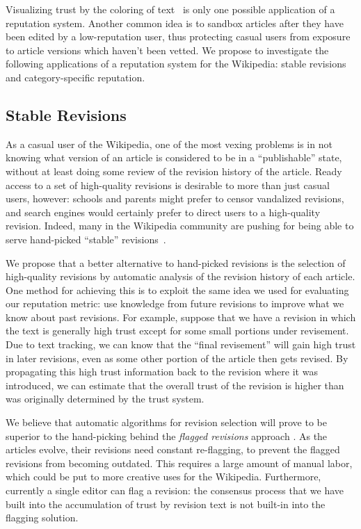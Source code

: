 
Visualizing trust by the coloring of
text~\cite{WikiMTWtrust06,Cr06,McGuinness06}
is only one possible application of a reputation system.
Another common idea is to sandbox articles
after they have been edited by a low-reputation user,
thus protecting casual users from exposure to
article versions which haven't been vetted.
We propose to investigate the following
applications of a reputation system for
the Wikipedia: stable revisions and category-specific
reputation.

\subsection{Stable Revisions}

As a casual user of the Wikipedia, one of the most vexing problems is in
not knowing what version of an article is considered
to be in a ``publishable'' state, without at least doing some
review of the revision history of the article.
Ready access to a set of high-quality revisions is
desirable to more than just casual users, however: 
schools and parents might prefer to censor vandalized
revisions, and search engines would certainly
prefer to direct users to a high-quality revision.
Indeed, many in the Wikipedia community are pushing for
being able to serve hand-picked ``stable''
revisions~\cite{flagged-revisions}.

We propose that a better alternative to hand-picked revisions is
the selection of high-quality revisions by automatic analysis of the
revision history of each article.
One method for achieving this is to exploit the same idea
we used for evaluating our reputation metric: use knowledge
from future revisions to improve what we know about past revisions.
For example, suppose that we have a revision in which the text
is generally high trust except for some small portions under revisement.
Due to text tracking, we can know that the ``final revisement''
will gain high trust in later revisions, even as some other
portion of the article then gets revised.
By propagating this high trust information back to the revision
where it was introduced, we can estimate that the overall
trust of the revision is higher than was originally
determined by the trust system.


We believe that automatic algorithms for revision selection will prove
to be superior to the hand-picking behind the {\em flagged revisions\/}
approach \cite{flagged-revisions}.
As the articles evolve, their revisions need constant re-flagging, to
prevent the flagged revisions from becoming outdated.
This requires a large amount of manual labor, which could be put to
more creative uses for the Wikipedia.
Furthermore, currently a single editor can flag a revision: the
consensus process that we have built into the accumulation of trust by
revision text is not built-in into the flagging solution.


